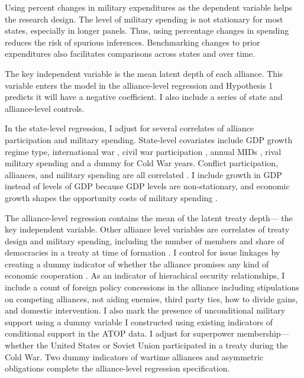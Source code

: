 \documentclass[12pt]{article}
\begin{document}
Using percent changes in military expenditures as the dependent variable helps the research design. 
The level of military spending is not stationary for most states, especially in longer panels. 
Thus, using percentage changes in spending reduces the risk of spurious inferences.
Benchmarking changes to prior expenditures also facilitates comparisons across states and over time. 


The key independent variable is the mean latent depth of each alliance. 
This variable enters the model in the alliance-level regression and Hypothesis 1 predicts it will have a negative coefficient. 
I also include a series of state and alliance-level controls. 


In the state-level regression, I adjust for several correlates of alliance participation and military spending. 
State-level covariates include GDP growth \citep{Boltetal2018} regime type, international war \citep{Reiteretal2016}, civil war participation \citep{SarkeesWayman2010}, annual MIDs \citep{Gibleretal2016}, rival military spending \citep{ThompsonDreyer2012} and a dummy for Cold War years.
Conflict participation, alliances, and military spending are all correlated \citep{SeneseVasquez2008}.
I include growth in GDP instead of levels of GDP because GDP levels are non-stationary, and economic growth shapes the opportunity costs of military spending \citep{Kimball2010, Zielinskietal2017}.  


The alliance-level regression contains the mean of the latent treaty depth--- the key independent variable. 
Other alliance level variables are correlates of treaty design and military spending, including the number of members and share of democracies in a treaty at time of formation \citep{Chibaetal2015}. 
I control for issue linkages by creating a dummy indicator of whether the alliance promises any kind of economic cooperation \citep{Poast2013, LongLeeds2006}. 
As an indicator of hierachical security relationships, I include a count of foreign policy concessions in the alliance including stipulations on competing alliances, not aiding enemies, third party ties, how to divide gains, and domestic intervention. 
I also mark the presence of unconditional military support using a dummy variable I constructed using existing indicators of conditional support in the ATOP data. 
I adjust for superpower membership--- whether the United States or Soviet Union participated in a treaty during the Cold War. 
Two dummy indicators of wartime alliances and asymmetric obligations \citep{Leedsetal2002} complete the alliance-level regression specification. 
\end{document}
